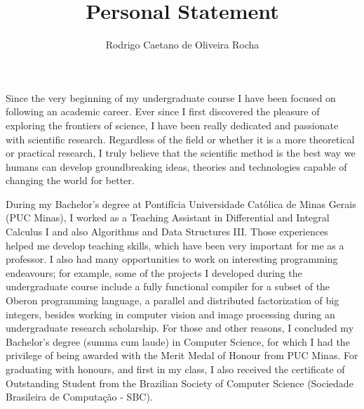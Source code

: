 \documentclass{article}
\title{Personal Statement}
\author{Rodrigo Caetano de Oliveira Rocha}
\date{}
\begin{document}
\maketitle

Since the very beginning of my undergraduate course I have been focused on
following an academic career.  Ever since I first discovered the pleasure of
exploring the frontiers of science, I have been really dedicated and passionate
with scientific research.  Regardless of the field or whether it is a more
theoretical or practical research, I truly believe that the scientific method is the best way
we humans can develop groundbreaking ideas, theories and technologies capable of changing
the world for better.

During my Bachelor's degree at Pontif\'{i}cia Universidade Cat\'{o}lica de
Minas Gerais (PUC Minas), I worked as a Teaching Assistant in Differential and
Integral Calculus I and also Algorithms and Data Structures III. Those
experiences helped me develop teaching skills, which have been very important
for me as a professor. I also had many opportunities to work on interesting
programming endeavours; for example, some of the projects I developed during
the undergraduate course include a fully functional compiler for a subset of
the Oberon programming language, a parallel and distributed factorization of
big integers, besides working in computer vision and image processing during an
undergraduate research scholarship. For those and other reasons, I concluded my
Bachelor's degree (summa cum laude) in Computer Science, for which I had the
privilege of being awarded with the Merit Medal of Honour from PUC Minas.  For
graduating with honours, and first in my class, I also received the certificate
of Outstanding Student from the Brazilian Society of Computer Science
(Sociedade Brasileira de Computa\c{c}\~{a}o - SBC).
\end{document}
